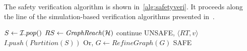 The safety verification algorithm is shown in~\ref{alg:safetyveri}. It proceeds along the line of the simulation-based verification algorithms presented in~\cite{DMV:EMSOFT2013, FanMitra:2015df, DuggiralaMV:2015c2e2}.

\begin{algorithm}
	\caption{$\mathit{VerifySafety}(\H,\U)$ verifies safety of hybrid system $\H$ with respect to unsafe set $\U$.}
	\label{alg:safetyveri}
	\While {$\I \neq \emptyset$}
	{	
		$S \gets {\mathcal I}.pop()$\;
		$RS \gets \mathit{GraphReach}({\mathcal H})$ \;
		{ continue\;}
		{\Return UNSAFE, $\langle RT,v \rangle$}
		\Else
		{
			{$I.push (Partition(S))$ \;}	
			{Or, $G \gets RefineGraph(G)$ \;}
		}
	}
	\Return SAFE
\end{algorithm}

%
%


